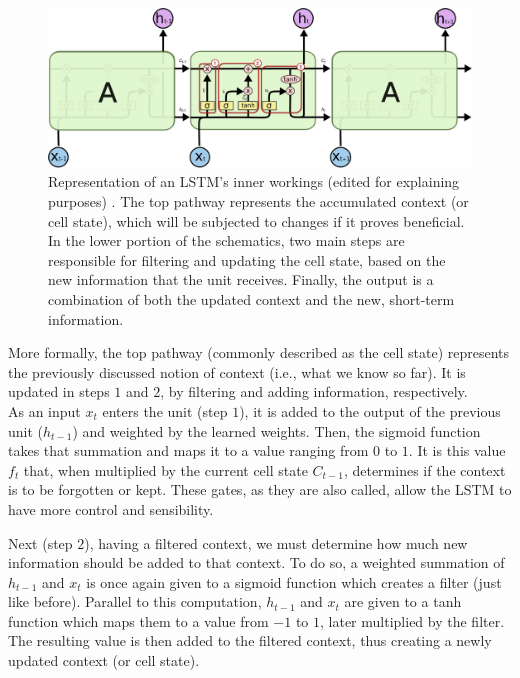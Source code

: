 \begin{figure}[h]
\centering
\includegraphics[width=330pt]{figures/figure_15.pdf}
\caption{Representation of an \ac{LSTM}'s inner workings (edited for explaining purposes) \cite{lstm_explained}. The top pathway represents the accumulated context (or cell state), which will be subjected to changes if it proves beneficial. In the lower portion of the schematics, two main steps are responsible for filtering and updating the cell state, based on the new information that the unit receives. Finally, the output is a combination of both the updated context and the new, short-term information.}
\label{fig:lstm_unit}
\end{figure}

More formally, the top pathway (commonly described as the cell state) represents the previously discussed notion of context (i.e., what we know so far). It is updated in steps $1$ and $2$, by filtering and adding information, respectively.\\

As an input $x_{t}$ enters the unit (step $1$), it is added to the output of the previous unit ($h_{t-1}$) and weighted by the learned weights. Then, the sigmoid function takes that summation and maps it to a value ranging from $0$ to $1$. It is this value $f_{t}$ that, when multiplied by the current cell state $C_{t-1}$, determines if the context is to be forgotten or kept. These gates, as they are also called, allow the \ac{LSTM} to have more control and sensibility.

Next (step $2$), having a filtered context, we must determine how much new information should be added to that context. To do so, a weighted summation of $h_{t-1}$ and $x_{t}$ is once again given to a sigmoid function which creates a filter (just like before). Parallel to this computation, $h_{t-1}$ and $x_{t}$ are given to a tanh function which maps them to a value from $-1$ to $1$, later multiplied by the filter. The resulting value is then added to the filtered context, thus creating a newly updated context (or cell state).

